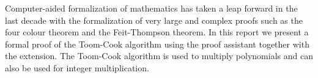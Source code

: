 Computer-aided formalization of mathematics has taken a leap forward in the
last decade with the formalization of very large and complex proofs such as the
four colour theorem and the Feit-Thompson theorem. In this report we present a
formal proof of the Toom-Cook algorithm using the \coq{} proof assistant together
with the \ssr{} extension. The Toom-Cook algorithm is used to multiply
polynomials and can also be used for integer multiplication.

